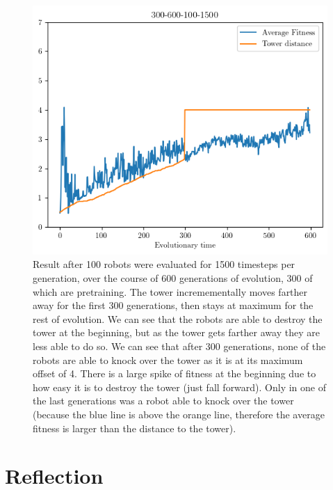\documentclass[12pt, a4paper]{article}
\begin{document}


\begin{figure}[h]
\centering
\includegraphics[width=1\textwidth]{300-600-100-1500/300-600-100-1500.png}
\caption{Result after 100 robots were evaluated for 1500 timesteps per generation, over the course of 600 generations of evolution, 300 of which are pretraining. The tower incremementally moves farther away for the first 300 generations, then stays at maximum for the rest of evolution. We can see that the robots are able to destroy the tower at the beginning, but as the tower gets farther away they are less able to do so. We can see that after 300 generations, none of the robots are able to knock over the tower as it is at its maximum offset of 4. There is a large spike of fitness at the beginning due to how easy it is to destroy the tower (just fall forward). Only in one of the last generations was a robot able to knock over the tower (because the blue line is above the orange line, therefore the average fitness is larger than the distance to the tower).}

\end{figure}

\section{Reflection}
\end{document}
